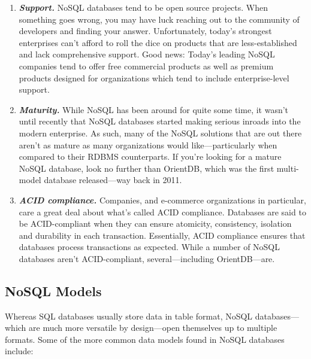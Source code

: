 \documentclass[
	final,
	a4paper,
	oneside,
	parskip=half,
	headings=standardclasses,
	headings=big,
	pointednumbers,
    fleqn
]{scrartcl}
\newcommand{\brand}[1]{\textbf{\textit{#1}}}
\begin{document}
\begin{multicols*}{2}
                \begin{enumerate}
                    \item{
                        \brand{Support.} NoSQL databases tend to be open source projects. When something goes wrong, you may have luck reaching out to the community of developers and finding your answer. Unfortunately, today’s strongest enterprises can’t afford to roll the dice on products that are less-established and lack comprehensive support. Good news: Today’s leading NoSQL companies tend to offer free commercial products as well as premium products designed for organizations which tend to include enterprise-level support.
                    }
                    \item{
                        \brand{Maturity.} While NoSQL has been around for quite some time, it wasn’t until recently that NoSQL databases started making serious inroads into the modern enterprise. As such, many of the NoSQL solutions that are out there aren’t as mature as many organizations would like—particularly when compared to their RDBMS counterparts. If you’re looking for a mature NoSQL database, look no further than OrientDB, which was the first multi-model database released—way back in 2011.
                    }
                    \item{
                        \brand{ACID compliance.} Companies, and e-commerce organizations in particular, care a great deal about what’s called ACID compliance. Databases are said to be ACID-compliant when they can ensure atomicity, consistency, isolation and durability in each transaction. Essentially, ACID compliance ensures that databases process transactions as expected. While a number of NoSQL databases aren’t ACID-compliant, several—including OrientDB—are.
                    }
                \end{enumerate}

        \subsection{NoSQL Models}
            
            Whereas SQL databases usually store data in table format, NoSQL databases—which are much more versatile by design—open themselves up to multiple formats. Some of the more common data models found in NoSQL databases include:


\end{multicols*}
\end{document}
